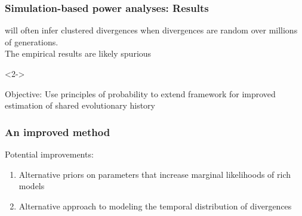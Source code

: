 \begin{frame}
    \frametitle{Simulation-based power analyses: Results}
        \msb will often infer clustered divergences when divergences are random
        over millions of generations. \\

    \bigskip
    The empirical results are likely spurious \\

    \begin{onlyenv}<2->
        \begin{block}{Objective:}
            Use principles of probability to extend \msb framework for improved
            estimation of shared evolutionary history
        \end{block}
    \end{onlyenv}
\end{frame}




\begin{frame}[label=improvements]
    \frametitle{An improved method}
    Potential improvements:
    \begin{enumerate}
        \item Alternative priors on parameters that increase marginal
            likelihoods of rich models
        \item Alternative approach to modeling the temporal distribution of
            divergences
    \end{enumerate}
\end{frame}

